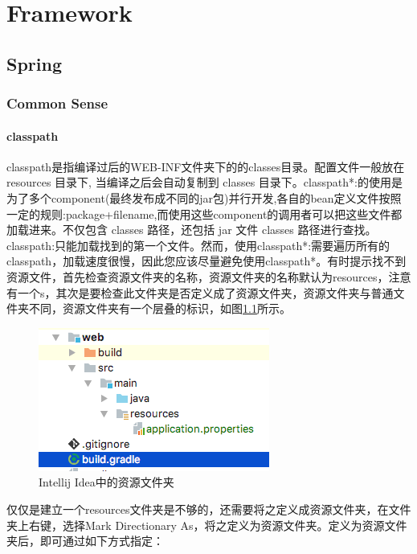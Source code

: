 \documentclass[letter]{book}
\begin{document}


\part{Framework}

\chapter{Spring}

\section{Common Sense}

\subsection{classpath}

classpath是指编译过后的WEB-INF文件夹下的的classes目录。配置文件一般放在 resources 目录下, 当编译之后会自动复制到 classes 目录下。classpath*:的使用是为了多个component(最终发布成不同的jar包)并行开发,各自的bean定义文件按照一定的规则:package+filename,而使用这些component的调用者可以把这些文件都加载进来。不仅包含 classes 路径，还包括 jar 文件 classes 路径进行查找。classpath:只能加载找到的第一个文件。然而，使用classpath*:需要遍历所有的classpath，加载速度很慢，因此您应该尽量避免使用classpath*。有时提示找不到资源文件，首先检查资源文件夹的名称，资源文件夹的名称默认为resources，注意有一个s，其次是要检查此文件夹是否定义成了资源文件夹，资源文件夹与普通文件夹不同，资源文件夹有一个层叠的标识，如图\ref{fig:javaresourcefolder}所示。

\begin{figure}[htbp]
	\centering
	\includegraphics[scale=0.8]{javaresourcefolder.png}
	\caption{Intellij Idea中的资源文件夹}
	\label{fig:javaresourcefolder}
\end{figure}

仅仅是建立一个resources文件夹是不够的，还需要将之定义成资源文件夹，在文件夹上右键，选择Mark Directionary As，将之定义为资源文件夹。定义为资源文件夹后，即可通过如下方式指定：
\end{document}
